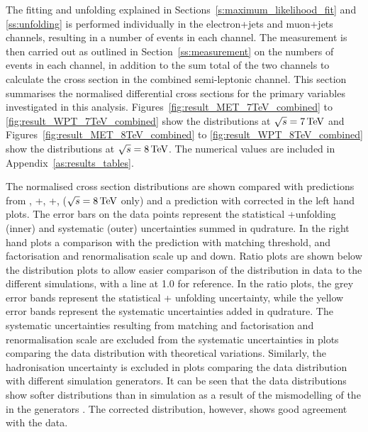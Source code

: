 The fitting and unfolding explained in Sections~\ref{s:maximum_likelihood_fit} and \ref{ss:unfolding} is
performed individually in the electron+jets and muon+jets channels, resulting in a number of \ttbar events in
each channel. The measurement is then carried out as outlined in Section~\ref{ss:measurement} on the numbers
of events in each channel, in addition to the sum total of the two channels to calculate the cross section in
the combined semi-leptonic channel. This section summarises the normalised differential cross sections for the
primary variables investigated in this analysis. Figures~\ref{fig:result_MET_7TeV_combined} to
\ref{fig:result_WPT_7TeV_combined} show the distributions at $\sqrt{s}=7\,\text{Te\hspace{-.08em}V}$ and
Figures~\ref{fig:result_MET_8TeV_combined} to \ref{fig:result_WPT_8TeV_combined} show the distributions at
$\sqrt{s}=8\,\text{Te\hspace{-.08em}V}$. The numerical values are included in Appendix~\ref{as:results_tables}.

The normalised cross section distributions are shown compared with predictions from \MADGRAPH,
\POWHEG+\PYTHIA, \POWHEG+\HERWIG, \MCATNLO ($\sqrt{s}=8\,\text{Te\hspace{-.08em}V}$ only) and a \MADGRAPH prediction with corrected
\tquark \pt in the left hand plots. The error bars on the data points represent the statistical +unfolding
(inner) and systematic (outer) uncertainties summed in qudrature. In the right hand plots a comparison with
the \MADGRAPH prediction with matching threshold, and factorisation and renormalisation scale up and down.
Ratio plots are shown below the distribution plots to allow easier comparison of the distribution in data to
the different simulations, with a line at 1.0 for reference. In the ratio plots, the grey error bands
represent the statistical + unfolding uncertainty, while the yellow error bands represent the systematic
uncertainties added in qudrature. The systematic uncertainties resulting from matching and factorisation and
renormalisation scale are excluded from the systematic uncertainties in plots comparing the data distribution
with theoretical variations. Similarly, the hadronisation uncertainty is excluded in plots comparing the data
distribution with different simulation generators. It can be seen that the data distributions show softer
distributions than in simulation as a result of the mismodelling of the \tquark \pt in the generators
\cite{Chatrchyan:2012saa}. The corrected \MADGRAPH distribution, however, shows good agreement with the data.

